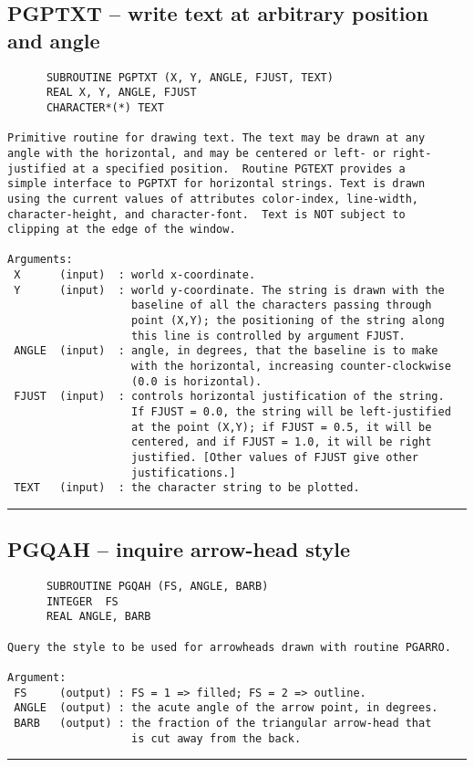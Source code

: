 {\subsection*{PGPTXT -- write text at arbitrary position and angle }
\begin{verbatim}
      SUBROUTINE PGPTXT (X, Y, ANGLE, FJUST, TEXT)
      REAL X, Y, ANGLE, FJUST
      CHARACTER*(*) TEXT

Primitive routine for drawing text. The text may be drawn at any
angle with the horizontal, and may be centered or left- or right-
justified at a specified position.  Routine PGTEXT provides a
simple interface to PGPTXT for horizontal strings. Text is drawn
using the current values of attributes color-index, line-width,
character-height, and character-font.  Text is NOT subject to
clipping at the edge of the window.

Arguments:
 X      (input)  : world x-coordinate.
 Y      (input)  : world y-coordinate. The string is drawn with the
                   baseline of all the characters passing through
                   point (X,Y); the positioning of the string along
                   this line is controlled by argument FJUST.
 ANGLE  (input)  : angle, in degrees, that the baseline is to make
                   with the horizontal, increasing counter-clockwise
                   (0.0 is horizontal).
 FJUST  (input)  : controls horizontal justification of the string.
                   If FJUST = 0.0, the string will be left-justified
                   at the point (X,Y); if FJUST = 0.5, it will be
                   centered, and if FJUST = 1.0, it will be right
                   justified. [Other values of FJUST give other
                   justifications.]
 TEXT   (input)  : the character string to be plotted.
\end{verbatim}
\hrule


\subsection*{PGQAH -- inquire arrow-head style }
\begin{verbatim}
      SUBROUTINE PGQAH (FS, ANGLE, BARB)
      INTEGER  FS
      REAL ANGLE, BARB

Query the style to be used for arrowheads drawn with routine PGARRO.

Argument:
 FS     (output) : FS = 1 => filled; FS = 2 => outline.
 ANGLE  (output) : the acute angle of the arrow point, in degrees.
 BARB   (output) : the fraction of the triangular arrow-head that
                   is cut away from the back. 
\end{verbatim}
\hrule


}
